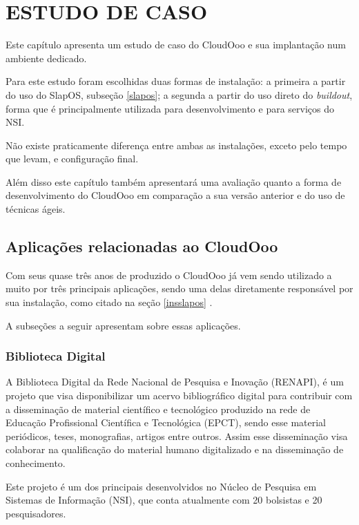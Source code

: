 \chapter{ESTUDO DE CASO}
\thispagestyle{empty}

Este capítulo apresenta um estudo de caso do CloudOoo e sua implantação num ambiente dedicado.

Para este estudo foram escolhidas duas formas de instalação: a primeira a partir do uso do SlapOS, subseção \ref{slapos}; a segunda a partir do uso direto do \textit{buildout}, forma que é principalmente utilizada para desenvolvimento e para serviços do NSI.

Não existe praticamente diferença entre ambas as instalações, exceto pelo tempo que levam, e configuração final.

Além disso este capítulo também apresentará uma avaliação quanto a forma de desenvolvimento do CloudOoo em comparação a sua versão anterior e do uso de técnicas ágeis.


\section{Aplicações relacionadas ao CloudOoo}

Com seus quase três anos de produzido o CloudOoo já vem sendo utilizado a muito por três principais aplicações, sendo uma delas diretamente responsável por sua instalação, como citado na seção \ref{insslapos} .

A subseções a seguir apresentam sobre essas aplicações.


\subsection{Biblioteca Digital}

A Biblioteca Digital da Rede Nacional de Pesquisa e Inovação (RENAPI), é um projeto que visa disponibilizar um acervo bibliográfico digital para contribuir com a disseminação de material científico e tecnológico produzido na rede de Educação Profissional Científica e Tecnológica (EPCT), sendo esse material periódicos, teses, monografias, artigos entre outros. Assim esse disseminação visa colaborar na qualificação do material humano digitalizado e na disseminação de conhecimento.

Este projeto é um dos principais desenvolvidos no Núcleo de Pesquisa em Sistemas de Informação (NSI), que conta atualmente com 20 bolsistas e 20 pesquisadores.


